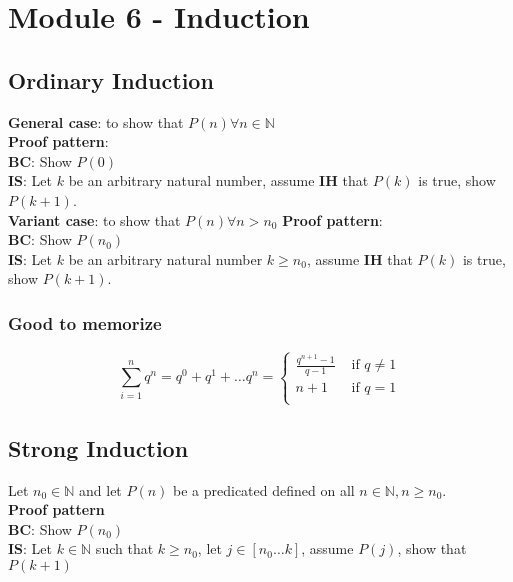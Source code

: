 \chapter{Module 6 - Induction}

\section{Ordinary Induction}
\begin{framed}

   \textbf{General case}: to show that $P(n) \forall n \in \mathbb{N}$ \\
   
   \textbf{Proof pattern}: \\
   \textbf{BC}: Show $P(0)$ \\
   \textbf{IS}: Let $k$ be an arbitrary natural number, assume \textbf{IH} that $P(k)$ is true, show $P(k + 1)$.  \\

   \textbf{Variant case}: to show that $P(n) \forall n > n_0$ 
   \textbf{Proof pattern}: \\
   \textbf{BC}: Show $P(n_0)$ \\
   \textbf{IS}: Let $k$ be an arbitrary natural number $k \geq n_0$, assume \textbf{IH} that $P(k)$ is true, show $P(k + 1)$.  \\

\end{framed}

\subsection{Good to memorize}

\[
   \sum_{i = 1}^{n} q^n = q^0 + q^1 + \hdots q^n = 
   \begin{cases}
      \frac{q^{n + 1} - 1}{q - 1} & \text{ if } q \neq 1 \\
      n + 1 & \text{ if } q = 1 \\
   \end{cases}
   
\] 

\section{Strong Induction}

\begin{framed}
Let $n_0 \in \mathbb{N}$  and let $P(n)$ be a predicated defined on all $n \in \mathbb{N}, n \geq n_0$.  \\

\textbf{Proof pattern} \\

\textbf{BC}: Show $P(n_0) $ \\

\textbf{IS}: Let $k \in \mathbb{N}$ such that $ k \geq n_0$, let $j \in [n_0 \hdots k]$, assume $P(j)$, show that  $P(k + 1) $
\end{framed}

